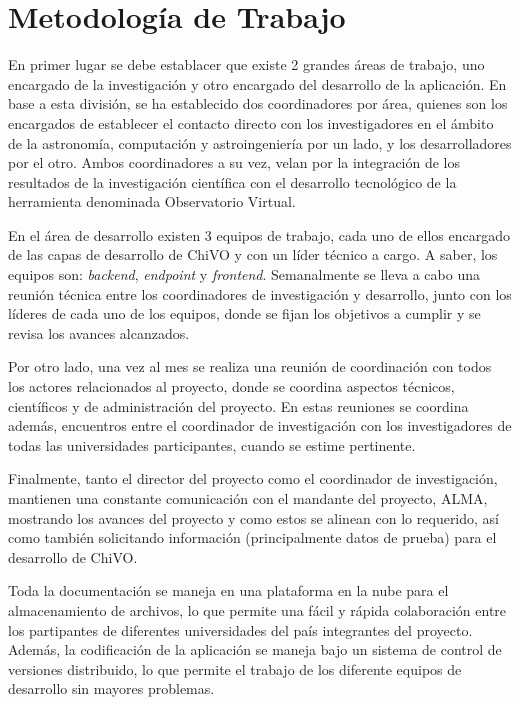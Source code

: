 \section{Metodología de Trabajo}

En primer lugar se debe establacer que existe 2 grandes áreas de
trabajo, uno encargado de la investigación y otro encargado del
desarrollo de la aplicación. En base a esta división, se ha
establecido dos coordinadores por área, quienes son los encargados de
establecer el contacto directo con los investigadores en el ámbito de
la astronomía, computación y astroingeniería por un lado, y los
desarrolladores por el otro. Ambos coordinadores a su vez, velan por
la integración de los resultados de la investigación científica con el
desarrollo tecnológico de la herramienta denominada Observatorio Virtual.

En el área de desarrollo existen 3 equipos de trabajo, cada uno de
ellos encargado de las capas de desarrollo de ChiVO y con un líder
técnico a cargo. A saber, los equipos son: \emph{backend},
\emph{endpoint} y \emph{frontend}. Semanalmente se lleva a cabo una
reunión técnica entre los coordinadores de investigación y desarrollo,
junto con los líderes de cada uno de los equipos, donde se fijan los
objetivos a cumplir y se revisa los avances alcanzados.

Por otro lado, una vez al mes se realiza una reunión de coordinación
con todos los actores relacionados al proyecto, donde se coordina
aspectos técnicos, científicos y de administración del proyecto. En
estas reuniones se coordina además, encuentros entre el coordinador de
investigación con los investigadores de todas las universidades
participantes, cuando se estime pertinente.

Finalmente, tanto el director del proyecto como el coordinador de
investigación, mantienen una constante comunicación con el mandante
del proyecto, ALMA, mostrando los avances del proyecto y como estos se
alinean con lo requerido, así como también solicitando información
(principalmente datos de prueba) para el desarrollo de ChiVO.

Toda la documentación se maneja en una plataforma en la nube para el
almacenamiento de archivos, lo que permite una fácil y rápida
colaboración entre los partipantes de diferentes universidades del
país integrantes del proyecto. Además, la codificación de la
aplicación se maneja bajo un sistema de control de versiones
distribuido, lo que permite el trabajo de los diferente equipos de
desarrollo sin mayores problemas.
